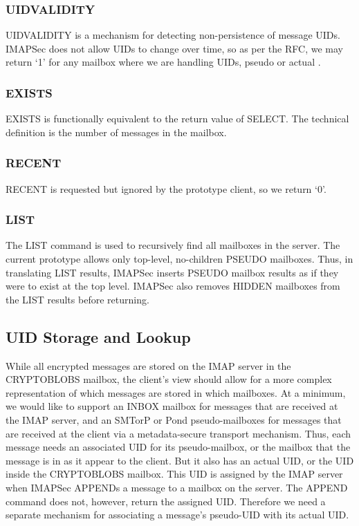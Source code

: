 \documentclass[pageno]{jpaper}
\newcommand{\project}{IMAPSec }
\begin{document}
\subsubsection{UIDVALIDITY} UIDVALIDITY is a mechanism for detecting non-persistence of message UIDs. \project does not allow UIDs to change over time, so as per the RFC, we may return `1' for any mailbox where we are handling UIDs, pseudo or actual \cite{rfc3501}.

\label{exists}
\subsubsection{EXISTS} EXISTS is functionally equivalent to the return value of SELECT. The technical definition is the number of messages in the mailbox.

\subsubsection{RECENT} RECENT is requested but ignored by the prototype client, so we return `0'.

\subsubsection{LIST} The LIST command is used to recursively find all mailboxes in the server. The current prototype allows only top-level, no-children PSEUDO mailboxes. Thus, in translating LIST results, \project inserts PSEUDO mailbox results as if they were to exist at the top level. \project also removes HIDDEN mailboxes from the LIST results before returning.

\label{uid-translation}
\subsection{UID Storage and Lookup}
While all encrypted messages are stored on the IMAP server in the CRYPTOBLOBS mailbox, the client's view should allow for a more complex representation of which messages are stored in which mailboxes. At a minimum, we would like to support an INBOX mailbox for messages that are received at the IMAP server, and an SMTorP or Pond pseudo-mailboxes for messages that are received at the client via a metadata-secure transport mechanism. Thus, each message needs an associated UID for its pseudo-mailbox, or the mailbox that the message is in as it appear to the client. But it also has an actual UID, or the UID inside the CRYPTOBLOBS mailbox. This UID is assigned by the IMAP server when \project APPENDs a message to a mailbox on the server. The APPEND command does not, however, return the assigned UID. Therefore we need a separate mechanism for associating a message's pseudo-UID with its actual UID.
\end{document}
